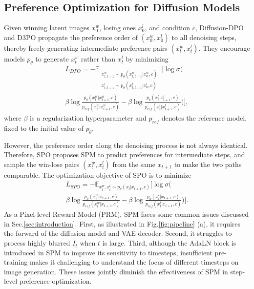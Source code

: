 \subsection{Preference Optimization for Diffusion Models}

Given winning latent images $x_0^w$, losing ones $x_0^l$, and condition $c$, Diffusion-DPO \cite{diffusion_dpo} and D3PO \cite{d3po} propagate the preference order of $(x_0^w, x_0^l)$ to all denoising steps, thereby freely generating intermediate preference pairs $(x_t^w, x_t^l)$. They encourage models $p_{\theta}$ to generate $x_t^w$ rather than $x_t^l$ by minimizing
\vspace{-1pt}
\begin{multline}
    L_{DPO} = -\mathbb{E}_{\substack{x^w_{t,t+1} \sim p_\theta(x^w_{t,t+1}|x^w_0,c), \\
    x^l_{t,t+1} \sim p_\theta(x^l_{t,t+1}|x^l_0,c)}}\biggl[\log\sigma\biggl( \\
    \beta\log\frac{p_\theta(x_{t}^w|x_{t+1}^w,c)}{p_{ref}(x_{t}^w|x_{t+1}^w,c)}-\beta\log\frac{p_{\theta}(x_{t}^l|x_{t+1}^l,c)}{p_{ref}(x_{t}^l|x_{t+1}^l,c)}\biggr)\biggr],
\end{multline}
where $\beta$ is a regularization hyperparameter and $p_{ref}$ denotes the reference model, fixed to the initial value of $p_{\theta}$.

However, the preference order along the denoising process is not always identical. Therefore, SPO \cite{spo} proposes SPM to predict preferences for intermediate steps, and sample the win-lose pairs $(x^w_{t}, x^l_{t})$ from the same $x_{t+1}$ to make the two paths comparable. 
The optimization objective of SPO is to minimize
\vspace{-2pt}
\begin{multline}
    L_{SPO} = -\mathbb{E}_{x^w_{t},x^l_{t} \sim p_\theta(x_{t}|x_{t+1},c)}\biggl[\log\sigma\biggl( \\
    \beta\log\frac{p_\theta(x_{t}^w|x_{t+1},c)}{p_{ref}(x_{t}^w|x_{t+1},c)}-\beta\log\frac{p_{\theta}(x_{t}^l|x_{t+1},c)}{p_{ref}(x_{t}^l|x_{t+1},c)}\biggr)\biggr].
    \label{eq:spo_loss}
\end{multline}
As a Pixel-level Reward Model (PRM), SPM faces some common issues discussed in Sec.\;\ref{sec:introduction}. First, as illustrated in Fig.\;\ref{fig:pipeline} (a), it requires the forward of the diffusion model and VAE decoder. Second, it struggles to process highly blurred $I_t$ when $t$ is large. Third, although the AdaLN block \cite{dit} is introduced in SPM to improve its sensitivity to timesteps, insufficient pre-training makes it challenging to understand the focus of different timesteps on image generation. These issues jointly diminish the effectiveness of SPM in step-level preference optimization.